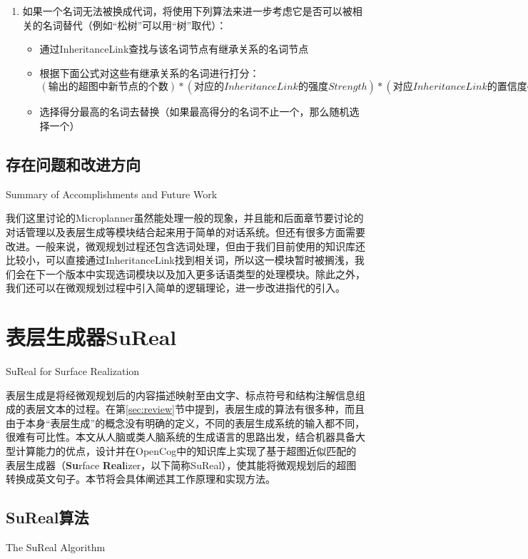 \begin{enumerate}
\item 如果一个名词无法被换成代词，将使用下列算法来进一步考虑它是否可以被相关的名词替代（例如“松树”可以用“树”取代）：

\begin{itemize}
\item 通过InheritanceLink查找与该名词节点有继承关系的名词节点
\item 根据下面公式对这些有继承关系的名词进行打分：
    $(输出的超图中新节点的个数) * (对应的InheritanceLink的强度Strength) * (对应InheritanceLink的置信度Confidence)$
\item 选择得分最高的名词去替换（如果最高得分的名词不止一个，那么随机选择一个）
\end{itemize}
\end{enumerate}


\subsection{存在问题和改进方向}{Summary of Accomplishments and Future Work}

我们这里讨论的Microplanner虽然能处理一般的现象，并且能和后面章节要讨论的对话管理以及表层生成等模块结合起来用于简单的对话系统。但还有很多方面需要改进。一般来说，微观规划过程还包含选词处理，但由于我们目前使用的知识库还比较小，可以直接通过InheritanceLink找到相关词，所以这一模块暂时被搁浅，我们会在下一个版本中实现选词模块以及加入更多话语类型的处理模块。除此之外，我们还可以在微观规划过程中引入简单的逻辑理论，进一步改进指代的引入。


\section{表层生成器SuReal}{SuReal for Surface Realization}

表层生成是将经微观规划后的内容描述映射至由文字、标点符号和结构注解信息组成的表层文本的过程。在第\ref{sec:review}节中提到，表层生成的算法有很多种，而且由于本身“表层生成”的概念没有明确的定义，不同的表层生成系统的输入都不同，很难有可比性。本文从人脑或类人脑系统的生成语言的思路出发，结合机器具备大型计算能力的优点，设计并在OpenCog中的知识库上实现了基于超图近似匹配的表层生成器（{\bf Su}rface {\bf Real}izer，以下简称SuReal），使其能将微观规划后的超图转换成英文句子。本节将会具体阐述其工作原理和实现方法。

\subsection{SuReal算法}{The SuReal Algorithm}


